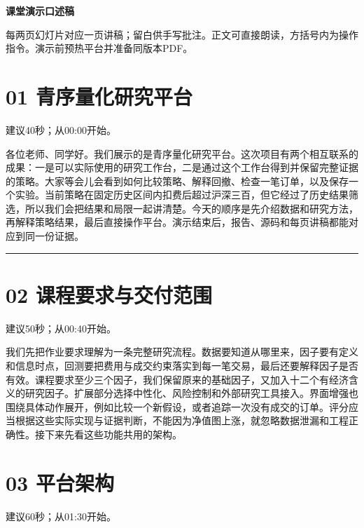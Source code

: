\documentclass[UTF8,a4paper,12pt]{ctexart}
\begin{document}
{\Large\bfseries\color{ink}课堂演示口述稿}\par

每两页幻灯片对应一页讲稿；留白供手写批注。正文可直接朗读，方括号内为操作指令。演示前预热平台并准备同版本PDF。

\section*{\color{ink}01  青序量化研究平台}

{\small\color{accent}建议40秒；从00:00开始。}\par

各位老师、同学好。我们展示的是青序量化研究平台。这次项目有两个相互联系的成果：一是可以实际使用的研究工作台，二是通过这个工作台得到并保留完整证据的策略。大家等会儿会看到如何比较策略、解释回撤、检查一笔订单，以及保存一个实验。当前策略在固定历史区间内扣费后超过沪深三百，但它经过了历史结果筛选，所以我们会把结果和局限一起讲清楚。今天的顺序是先介绍数据和研究方法，再解释策略结果，最后直接操作平台。演示结束后，报告、源码和每页讲稿都能对应到同一份证据。


\vspace{6mm}\noindent\textcolor{accent!40}{\rule{\textwidth}{0.4pt}}\par

\section*{\color{ink}02  课程要求与交付范围}

{\small\color{accent}建议50秒；从00:40开始。}\par

我们先把作业要求理解为一条完整研究流程。数据要知道从哪里来，因子要有定义和信息时点，回测要把费用与成交约束落实到每一笔交易，最后还要解释因子是否有效。课程要求至少三个因子，我们保留原来的基础因子，又加入十二个有经济含义的研究因子。扩展部分选择中性化、风险控制和外部研究工具接入。界面增强也围绕具体动作展开，例如比较一个新假设，或者追踪一次没有成交的订单。评分应当根据这些实际实现与证据判断，不能因为净值图上涨，就忽略数据泄漏和工程正确性。接下来先看这些功能共用的架构。


\newpage
\section*{\color{ink}03  平台架构}

{\small\color{accent}建议60秒；从01:30开始。}\par
\end{document}

